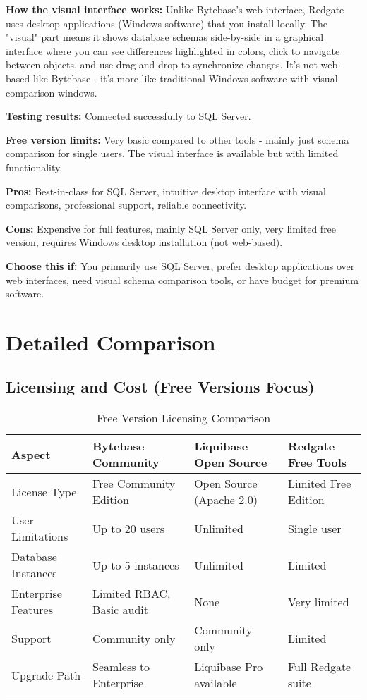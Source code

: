 \documentclass[11pt,a4paper]{article}
\begin{document}
\textbf{How the visual interface works:} Unlike Bytebase's web interface, Redgate uses desktop applications (Windows software) that you install locally. The "visual" part means it shows database schemas side-by-side in a graphical interface where you can see differences highlighted in colors, click to navigate between objects, and use drag-and-drop to synchronize changes. It's not web-based like Bytebase - it's more like traditional Windows software with visual comparison windows.

\textbf{Testing results:} Connected successfully to SQL Server.

\textbf{Free version limits:} Very basic compared to other tools - mainly just schema comparison for single users. The visual interface is available but with limited functionality.

\textbf{Pros:} Best-in-class for SQL Server, intuitive desktop interface with visual comparisons, professional support, reliable connectivity.

\textbf{Cons:} Expensive for full features, mainly SQL Server only, very limited free version, requires Windows desktop installation (not web-based).

\textbf{Choose this if:} You primarily use SQL Server, prefer desktop applications over web interfaces, need visual schema comparison tools, or have budget for premium software.

\newpage
\section{Detailed Comparison}

\subsection{Licensing and Cost (Free Versions Focus)}

\begin{table}[h!]
\centering
\begin{tabularx}{\textwidth}{|X|X|X|X|}
\hline
\textbf{Aspect} & \textbf{Bytebase Community} & \textbf{Liquibase Open Source} & \textbf{Redgate Free Tools} \\
\hline
License Type & Free Community Edition & Open Source (Apache 2.0) & Limited Free Edition \\
\hline
User Limitations & Up to 20 users & Unlimited & Single user \\
\hline
Database Instances & Up to 5 instances & Unlimited & Limited \\
\hline
Enterprise Features & Limited RBAC, Basic audit & None & Very limited \\
\hline
Support & Community only & Community only & Limited \\
\hline
Upgrade Path & Seamless to Enterprise & Liquibase Pro available & Full Redgate suite \\
\hline
\end{tabularx}
\caption{Free Version Licensing Comparison}
\end{table}
\end{document}
